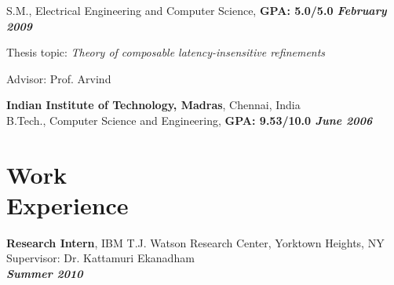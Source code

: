\documentclass[margin]{resume}
\begin{document}
\begin{resume}
\begin{list2}
    \end{list2}%
    S.M., Electrical Engineering and Computer Science, \hfill \textbf{GPA: 5.0/5.0 \textit{February 2009}}\\
    \begin{list2}
        \item Thesis topic: \textit{Theory of composable latency-insensitive refinements}
        \item Advisor:  Prof. Arvind
    \end{list2}%
    \textbf{Indian Institute of Technology, Madras}, Chennai, India\\
    B.Tech., Computer Science and Engineering, \hfill \textbf{GPA: 9.53/10.0 \textit{June 2006}}\\


    \section{\mysidestyle Work\\Experience}

    \textbf{Research Intern}, IBM T.J. Watson Research Center, Yorktown Heights, NY\\ 
    Supervisor: Dr. Kattamuri Ekanadham \\
\hfill \textbf{\textit{Summer 2010}}\\


\end{resume}
\end{document}
